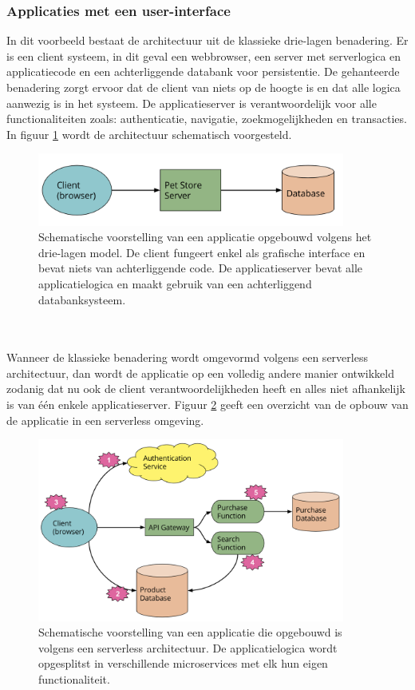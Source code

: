 \subsubsection{Applicaties met een user-interface}
In dit voorbeeld bestaat de architectuur uit de klassieke drie-lagen benadering. Er is een client systeem, in dit geval een webbrowser, een server met serverlogica en applicatiecode en een achterliggende databank voor persistentie. De gehanteerde benadering zorgt ervoor dat de client van niets op de hoogte is en dat alle logica aanwezig is in het systeem. De applicatieserver is verantwoordelijk voor alle functionaliteiten zoals: authenticatie, navigatie, zoekmogelijkheden en transacties. In figuur \ref{fig:drielagen_architectuur} wordt de architectuur schematisch voorgesteld.
\begin{figure}
    \centering
    \includegraphics[width=0.9\textwidth]{img/drielagen_architectuur.png}
    \caption{Schematische voorstelling van een applicatie opgebouwd volgens het drie-lagen model. De client fungeert enkel als grafische interface en bevat niets van achterliggende code. De applicatieserver bevat alle applicatielogica en maakt gebruik van een achterliggend databanksysteem. \autocite{Roberts2018}} 
    \label{fig:drielagen_architectuur}  
\end{figure}
\\\\
Wanneer de klassieke benadering wordt omgevormd volgens een serverless architectuur, dan wordt de applicatie op een volledig andere manier ontwikkeld zodanig dat nu ook de client verantwoordelijkheden heeft en alles niet afhankelijk is van één enkele applicatieserver. Figuur \ref{fig:serverless_architectuur} geeft een overzicht van de opbouw van de applicatie in een serverless omgeving.
\begin{figure}
    \centering
    \includegraphics[width=0.9\textwidth]{img/serverless_architectuur.png}
    \caption{Schematische voorstelling van een applicatie die opgebouwd is volgens een serverless architectuur. De applicatielogica wordt opgesplitst in verschillende microservices met elk hun eigen functionaliteit. \autocite{Roberts2018}} 
    \label{fig:serverless_architectuur}  
\end{figure}
